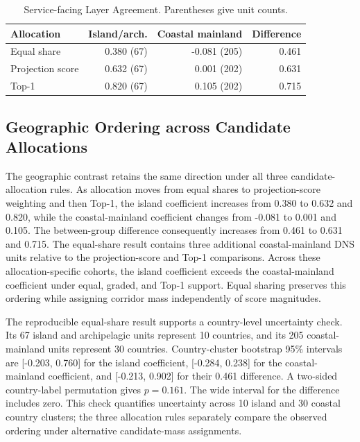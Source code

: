 \begin{table}[t]
  \centering
  \caption{Service-facing Layer Agreement. Parentheses give unit counts.}
  \label{tab:geographic-agreement}
  \footnotesize
  \setlength{\tabcolsep}{2.4pt}
  \begin{tabular}{lrrr}
    \toprule
    Allocation & Island/arch. & Coastal mainland & Difference \\
    \midrule
    Equal share & 0.380 (67) & -0.081 (205) & 0.461 \\
    Projection score & 0.632 (67) & 0.001 (202) & 0.631 \\
    Top-1 & 0.820 (67) & 0.105 (202) & 0.715 \\
    \bottomrule
  \end{tabular}
\end{table}

\subsection{Geographic Ordering across Candidate Allocations}
\label{subsec:allocation-robustness}

The geographic contrast retains the same direction under all three
candidate-allocation rules. As allocation moves from equal shares to
projection-score weighting and then Top-1, the island coefficient increases
from 0.380 to 0.632 and 0.820, while the coastal-mainland coefficient changes
from -0.081 to 0.001 and 0.105. The between-group difference consequently
increases from 0.461 to 0.631 and 0.715. The equal-share result contains three
additional coastal-mainland DNS units relative to the projection-score and
Top-1 comparisons. Across these allocation-specific cohorts, the
island coefficient exceeds the coastal-mainland coefficient under equal,
graded, and Top-1 support. Equal sharing preserves this ordering while
assigning corridor mass independently of score magnitudes.

The reproducible equal-share result supports a country-level uncertainty
check. Its 67 island and archipelagic units represent 10 countries, and its
205 coastal-mainland units represent 30 countries. Country-cluster bootstrap
95\% intervals are [-0.203, 0.760] for the island coefficient, [-0.284, 0.238]
for the coastal-mainland coefficient, and [-0.213, 0.902] for their 0.461
difference. A two-sided country-label permutation gives $p=0.161$. The wide
interval for the difference includes zero. This check quantifies uncertainty
across 10 island and 30 coastal country clusters; the three allocation rules
separately compare the observed ordering under alternative candidate-mass
assignments.

